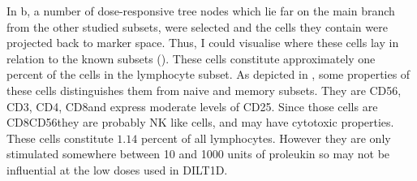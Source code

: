 In b, a number of dose-responsive tree nodes which lie far on the main branch from the other studied subsets, were selected and the cells they contain were projected back to marker space.
Thus, I could visualise where these cells lay in relation to the known subsets ().
These cells constitute approximately one percent of the cells in the lymphocyte subset.
As depicted in , some properties of these cells distinguishes them from naive and memory subsets.
They are CD56\high, CD3\negative, CD4\negative, CD8\positive and express moderate levels of CD25.
Since those cells are CD8\positive CD56\positive they are probably \gls{NK} like cells, and may have cytotoxic properties.
These cells constitute $1.14$ percent of all lymphocytes.
However they are only stimulated somewhere between 10 and 1000 units of proleukin so may not be influential at the low doses used in DILT1D.

